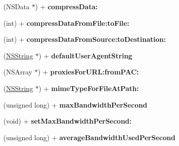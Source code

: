 \begin{DoxyCompactItemize}
\item 
\hypertarget{interface_a_s_i_h_t_t_p_request_a757f9e14bc7fb114713251f22f16f266}{
(NSData $\ast$) + {\bfseries compressData:}}
\label{interface_a_s_i_h_t_t_p_request_a757f9e14bc7fb114713251f22f16f266}

\item 
\hypertarget{interface_a_s_i_h_t_t_p_request_aa29ce97a20c2e9723a3feea159ceccbd}{
(int) + {\bfseries compressDataFromFile:toFile:}}
\label{interface_a_s_i_h_t_t_p_request_aa29ce97a20c2e9723a3feea159ceccbd}

\item 
\hypertarget{interface_a_s_i_h_t_t_p_request_a849507cf9413104d084a233da0851f8e}{
(int) + {\bfseries compressDataFromSource:toDestination:}}
\label{interface_a_s_i_h_t_t_p_request_a849507cf9413104d084a233da0851f8e}

\item 
\hypertarget{interface_a_s_i_h_t_t_p_request_adde353be686c11a87e7c2bb1f3b66fea}{
(\hyperlink{class_n_s_string}{NSString} $\ast$) + {\bfseries defaultUserAgentString}}
\label{interface_a_s_i_h_t_t_p_request_adde353be686c11a87e7c2bb1f3b66fea}

\item 
\hypertarget{interface_a_s_i_h_t_t_p_request_ab01db21bf0f7a061dd03837561dc0b4d}{
(NSArray $\ast$) + {\bfseries proxiesForURL:fromPAC:}}
\label{interface_a_s_i_h_t_t_p_request_ab01db21bf0f7a061dd03837561dc0b4d}

\item 
\hypertarget{interface_a_s_i_h_t_t_p_request_af0ff90cbf5e2f4e4b4dc1a7a801dc390}{
(\hyperlink{class_n_s_string}{NSString} $\ast$) + {\bfseries mimeTypeForFileAtPath:}}
\label{interface_a_s_i_h_t_t_p_request_af0ff90cbf5e2f4e4b4dc1a7a801dc390}

\item 
\hypertarget{interface_a_s_i_h_t_t_p_request_adbca39932d3860a615003ce57722e134}{
(unsigned long) + {\bfseries maxBandwidthPerSecond}}
\label{interface_a_s_i_h_t_t_p_request_adbca39932d3860a615003ce57722e134}

\item 
\hypertarget{interface_a_s_i_h_t_t_p_request_a42d27a50f0bcf03563e1c7b8ac8bfd7d}{
(void) + {\bfseries setMaxBandwidthPerSecond:}}
\label{interface_a_s_i_h_t_t_p_request_a42d27a50f0bcf03563e1c7b8ac8bfd7d}

\item 
\hypertarget{interface_a_s_i_h_t_t_p_request_ae3c70bd7067b067d3e26e846dd776207}{
(unsigned long) + {\bfseries averageBandwidthUsedPerSecond}}
\label{interface_a_s_i_h_t_t_p_request_ae3c70bd7067b067d3e26e846dd776207}


\end{DoxyCompactItemize}
